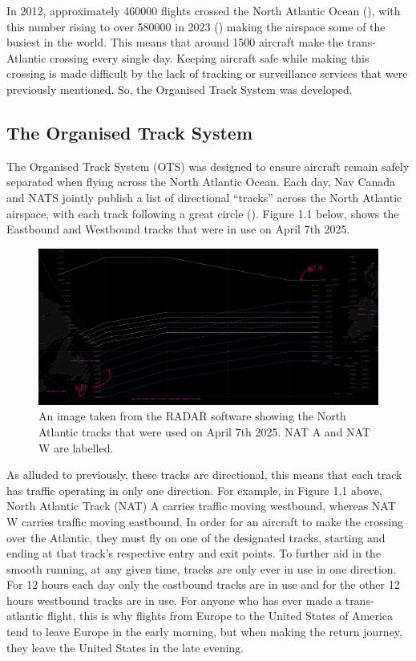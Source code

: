 \documentclass[stu, a4paper, 12pt, floatsintext]{apa7}
\numberwithin{figure}{section}
\numberwithin{table}{section}
\numberwithin{equation}{section}
\begin{document}
In 2012, approximately 460000 flights crossed the North Atlantic Ocean (\cite{SKYbrary}), with this number rising to over 580000 in 2023 (\cite{ForeFlight}) making the airspace some of the busiest in the world. This means that around 1500 aircraft make the trans-Atlantic crossing every single day. Keeping aircraft safe while making this crossing is made difficult by the lack of tracking or surveillance services that were previously mentioned. So, the Organised Track System was developed. 
\subsection{The Organised Track System}
The Organised Track System (OTS) was designed to ensure aircraft remain safely separated when flying across the North Atlantic Ocean. Each day, Nav Canada and NATS jointly publish a list of directional “tracks” across the North Atlantic airspace, with each track following a great circle (\cite{OTS}). Figure 1.1 below, shows the Eastbound and Westbound tracks that were in use on April 7th 2025. 

\begin{figure}[H]
    \caption{An image taken from the RADAR software showing the North Atlantic tracks that were used on April 7th 2025. NAT A and NAT W are labelled.}
    \label{fig:1.1}
    \centering
    \includegraphics[width=1.1\textwidth]{pictures/Figure 1.1.jpg}    
\end{figure}

As alluded to previously, these tracks are directional, this means that each track has traffic operating in only one direction. For example, in Figure 1.1 above, North Atlantic Track (NAT) A carries traffic moving westbound, whereas NAT W carries traffic moving eastbound. In order for an aircraft to make the crossing over the Atlantic, they must fly on one of the designated tracks, starting and ending at that track's respective entry and exit points. To further aid in the smooth running, at any given time, tracks are only ever in use in one direction. For 12 hours each day only the eastbound tracks are in use and for the other 12 hours westbound tracks are in use. For anyone who has ever made a trans-atlantic flight, this is why flights from Europe to the United States of America tend to leave Europe in the early morning, but when making the return journey, they leave the United States in the late evening. 
\end{document}
